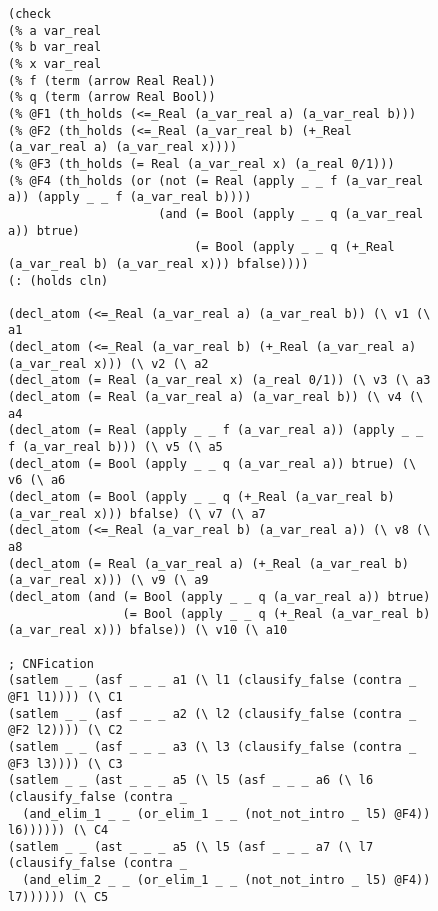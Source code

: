 \documentclass{llncs}
\begin{document}
\begin{figure}
{\scriptsize
\begin{verbatim}
(check
(% a var_real
(% b var_real
(% x var_real
(% f (term (arrow Real Real))
(% q (term (arrow Real Bool))
(% @F1 (th_holds (<=_Real (a_var_real a) (a_var_real b)))
(% @F2 (th_holds (<=_Real (a_var_real b) (+_Real (a_var_real a) (a_var_real x))))
(% @F3 (th_holds (= Real (a_var_real x) (a_real 0/1)))
(% @F4 (th_holds (or (not (= Real (apply _ _ f (a_var_real a)) (apply _ _ f (a_var_real b)))) 
                     (and (= Bool (apply _ _ q (a_var_real a)) btrue)
                          (= Bool (apply _ _ q (+_Real (a_var_real b) (a_var_real x))) bfalse))))
(: (holds cln)

(decl_atom (<=_Real (a_var_real a) (a_var_real b)) (\ v1 (\ a1
(decl_atom (<=_Real (a_var_real b) (+_Real (a_var_real a) (a_var_real x))) (\ v2 (\ a2
(decl_atom (= Real (a_var_real x) (a_real 0/1)) (\ v3 (\ a3
(decl_atom (= Real (a_var_real a) (a_var_real b)) (\ v4 (\ a4
(decl_atom (= Real (apply _ _ f (a_var_real a)) (apply _ _ f (a_var_real b))) (\ v5 (\ a5
(decl_atom (= Bool (apply _ _ q (a_var_real a)) btrue) (\ v6 (\ a6
(decl_atom (= Bool (apply _ _ q (+_Real (a_var_real b) (a_var_real x))) bfalse) (\ v7 (\ a7
(decl_atom (<=_Real (a_var_real b) (a_var_real a)) (\ v8 (\ a8
(decl_atom (= Real (a_var_real a) (+_Real (a_var_real b) (a_var_real x))) (\ v9 (\ a9
(decl_atom (and (= Bool (apply _ _ q (a_var_real a)) btrue)
                (= Bool (apply _ _ q (+_Real (a_var_real b) (a_var_real x))) bfalse)) (\ v10 (\ a10

; CNFication
(satlem _ _ (asf _ _ _ a1 (\ l1 (clausify_false (contra _ @F1 l1)))) (\ C1 
(satlem _ _ (asf _ _ _ a2 (\ l2 (clausify_false (contra _ @F2 l2)))) (\ C2 
(satlem _ _ (asf _ _ _ a3 (\ l3 (clausify_false (contra _ @F3 l3)))) (\ C3
(satlem _ _ (ast _ _ _ a5 (\ l5 (asf _ _ _ a6 (\ l6 (clausify_false (contra _
  (and_elim_1 _ _ (or_elim_1 _ _ (not_not_intro _ l5) @F4)) l6)))))) (\ C4
(satlem _ _ (ast _ _ _ a5 (\ l5 (asf _ _ _ a7 (\ l7 (clausify_false (contra _
  (and_elim_2 _ _ (or_elim_1 _ _ (not_not_intro _ l5) @F4)) l7)))))) (\ C5


\end{verbatim}}
\end{figure}
\end{document}
